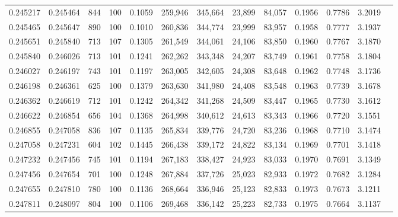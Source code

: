 \begin{tabular}{rrrrrrrrrrrrr}
0.245217 & 0.245464 &   844 & 100 &                                     0.1059 & 259,946 & 345,664 &  23,899 &  84,057 & 0.1956 & 0.7786 & 3.2019 \\
0.245465 & 0.245647 &   890 & 100 &                                     0.1010 & 260,836 & 344,774 &  23,999 &  83,957 & 0.1958 & 0.7777 & 3.1937 \\
0.245651 & 0.245840 &   713 & 107 &                                     0.1305 & 261,549 & 344,061 &  24,106 &  83,850 & 0.1960 & 0.7767 & 3.1870 \\
0.245840 & 0.246026 &   713 & 101 &                                     0.1241 & 262,262 & 343,348 &  24,207 &  83,749 & 0.1961 & 0.7758 & 3.1804 \\
0.246027 & 0.246197 &   743 & 101 &                                     0.1197 & 263,005 & 342,605 &  24,308 &  83,648 & 0.1962 & 0.7748 & 3.1736 \\
0.246198 & 0.246361 &   625 & 100 &                                     0.1379 & 263,630 & 341,980 &  24,408 &  83,548 & 0.1963 & 0.7739 & 3.1678 \\
0.246362 & 0.246619 &   712 & 101 &                                     0.1242 & 264,342 & 341,268 &  24,509 &  83,447 & 0.1965 & 0.7730 & 3.1612 \\
0.246622 & 0.246854 &   656 & 104 &                                     0.1368 & 264,998 & 340,612 &  24,613 &  83,343 & 0.1966 & 0.7720 & 3.1551 \\
0.246855 & 0.247058 &   836 & 107 &                                     0.1135 & 265,834 & 339,776 &  24,720 &  83,236 & 0.1968 & 0.7710 & 3.1474 \\
0.247058 & 0.247231 &   604 & 102 &                                     0.1445 & 266,438 & 339,172 &  24,822 &  83,134 & 0.1969 & 0.7701 & 3.1418 \\
0.247232 & 0.247456 &   745 & 101 &                                     0.1194 & 267,183 & 338,427 &  24,923 &  83,033 & 0.1970 & 0.7691 & 3.1349 \\
0.247456 & 0.247654 &   701 & 100 &                                     0.1248 & 267,884 & 337,726 &  25,023 &  82,933 & 0.1972 & 0.7682 & 3.1284 \\
0.247655 & 0.247810 &   780 & 100 &                                     0.1136 & 268,664 & 336,946 &  25,123 &  82,833 & 0.1973 & 0.7673 & 3.1211 \\
0.247811 & 0.248097 &   804 & 100 &                                     0.1106 & 269,468 & 336,142 &  25,223 &  82,733 & 0.1975 & 0.7664 & 3.1137 \\

\end{tabular}

